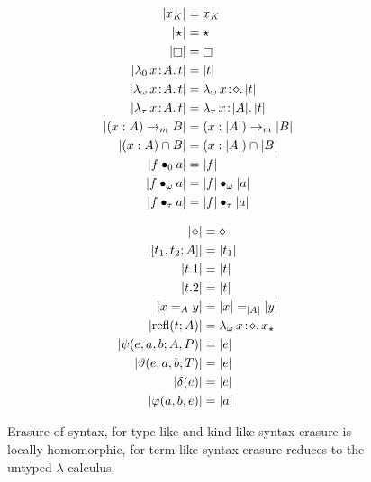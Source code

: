 

\begin{figure}
    \centering
    \begin{minipage}{0.5\textwidth}
        \begin{align*}
            |x_K| &= x_K \\
            |\!\star\!| &= \star \\
            |\kind| &= \kind \\
            |\abs{\lambda_0}{x}{A}{t}| &= |t| \\
            |\abs{\lambda_\omega}{x}{A}{t}| &= \abs{\lambda_\omega}{x}{\diamond}{|t|} \\
            |\abs{\lambda_\tau}{x}{A}{t}| &= \abs{\lambda_\tau}{x}{|A|}{|t|} \\
            |(x:A) \to_m B| &= (x:|A|) \to_m |B| \\
            |(x:A) \cap B| &= (x:|A|) \cap |B| \\
            |\app{f}{0}{a}| &= |f| \\
            |\app{f}{\omega}{a}| &= \app{|f|}{\omega}{|a|} \\
            |\app{f}{\tau}{a}| &= \app{|f|}{\tau}{|a|}
        \end{align*}
    \end{minipage}%
    \begin{minipage}{0.5\textwidth}
        \begin{align*}
            |\!\diamond\!| &= \diamond \\
            |[t_1, t_2; A]| &= |t_1| \\
            |t.1| &= |t| \\
            |t.2| &= |t| \\
            |x =_A y| &= |x| =_{|A|} |y| \\
            |\text{refl}(t; A)| &= {\lambda_\omega}\, x\! : \! \diamond.\, x_\star \\
            |\psi(e, a, b; A, P)| &= |e| \\
            |\vartheta(e, a, b; T)| &= |e| \\
            |\delta(e)| &= |e| \\
            |\varphi(a, b, e)| &= |a|
        \end{align*}
    \end{minipage}
    \caption{Erasure of syntax, for type-like and kind-like syntax erasure is locally homomorphic, for term-like syntax erasure reduces to the untyped $\lambda$-calculus.}
    \label{fig:2:erasure}
\end{figure}
